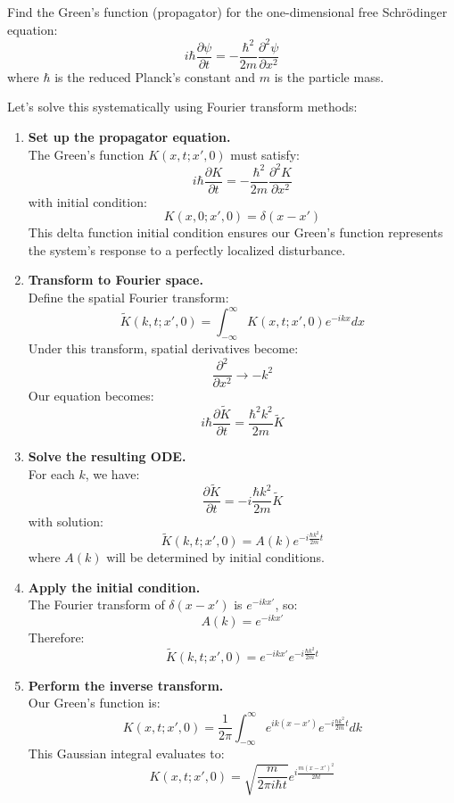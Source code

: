 \exampleline
\begin{example}
Find the Green's function (propagator) for the one-dimensional free Schrödinger equation:
\[
i\hbar\frac{\partial \psi}{\partial t} = -\frac{\hbar^2}{2m}\frac{\partial^2 \psi}{\partial x^2}
\]
where \(\hbar\) is the reduced Planck's constant and \(m\) is the particle mass.

\begin{solution}
Let's solve this systematically using Fourier transform methods:

\begin{enumerate}
\item \textbf{Set up the propagator equation.} \\
The Green's function \(K(x,t;x',0)\) must satisfy:
\[
i\hbar\frac{\partial K}{\partial t} = -\frac{\hbar^2}{2m}\frac{\partial^2 K}{\partial x^2}
\]
with initial condition:
\[
K(x,0;x',0) = \delta(x-x')
\]
This delta function initial condition ensures our Green's function represents the system's response to a perfectly localized disturbance.

\item \textbf{Transform to Fourier space.} \\
Define the spatial Fourier transform:
\[
\tilde{K}(k,t;x',0) = \int_{-\infty}^{\infty} K(x,t;x',0)e^{-ikx}dx
\]
Under this transform, spatial derivatives become:
\[
\frac{\partial^2}{\partial x^2} \rightarrow -k^2
\]
Our equation becomes:
\[
i\hbar\frac{\partial \tilde{K}}{\partial t} = \frac{\hbar^2k^2}{2m}\tilde{K}
\]

\item \textbf{Solve the resulting ODE.} \\
For each \(k\), we have:
\[
\frac{\partial \tilde{K}}{\partial t} = -i\frac{\hbar k^2}{2m}\tilde{K}
\]
with solution:
\[
\tilde{K}(k,t;x',0) = A(k)e^{-i\frac{\hbar k^2}{2m}t}
\]
where \(A(k)\) will be determined by initial conditions.

\item \textbf{Apply the initial condition.} \\
The Fourier transform of \(\delta(x-x')\) is \(e^{-ikx'}\), so:
\[
A(k) = e^{-ikx'}
\]
Therefore:
\[
\tilde{K}(k,t;x',0) = e^{-ikx'}e^{-i\frac{\hbar k^2}{2m}t}
\]

\item \textbf{Perform the inverse transform.} \\
Our Green's function is:
\[
K(x,t;x',0) = \frac{1}{2\pi}\int_{-\infty}^{\infty} e^{ik(x-x')}e^{-i\frac{\hbar k^2}{2m}t}dk
\]
This Gaussian integral evaluates to:
\[
K(x,t;x',0) = \sqrt{\frac{m}{2\pi i\hbar t}}e^{i\frac{m(x-x')^2}{2\hbar t}}
\]
\end{enumerate}


\end{solution}
\end{example}
